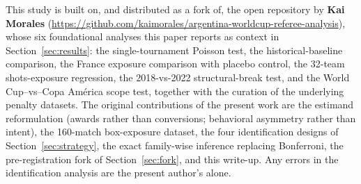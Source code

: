 \documentclass[11pt,a4paper]{article}
\begin{document}
This study is built on, and distributed as a fork of, the open repository by
\textbf{Kai Morales} (\url{https://github.com/kaimorales/argentina-worldcup-referee-analysis}),
whose six foundational analyses this paper reports as context in
Section~\ref{sec:results}: the single-tournament Poisson test, the historical-baseline
comparison, the France exposure comparison with placebo control, the 32-team
shots-exposure regression, the 2018-vs-2022 structural-break test, and the World
Cup--vs--Copa Am\'erica scope test, together with the curation of the underlying
penalty datasets. The original contributions of the present work are the estimand
reformulation (awards rather than conversions; behavioral asymmetry rather than
intent), the 160-match box-exposure dataset, the four identification designs of
Section~\ref{sec:strategy}, the exact family-wise inference replacing Bonferroni, the
pre-registration fork of Section~\ref{sec:fork}, and this write-up. Any errors in the
identification analysis are the present author's alone.
\end{document}
